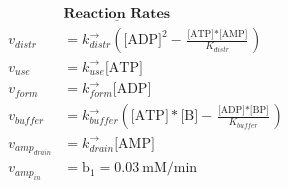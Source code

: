 \documentclass[10pt]{article}
\begin{document}
\begin{align*}&\underline{\textbf{Reaction Rates}}\\
v_{distr} &= k^{\rightarrow}_{distr}(\text{[ADP]}^2 - \frac{\text{[ATP]} * \text{[AMP]}}{K_{distr}})\\
v_{use} &= k^{\rightarrow}_{use}\text{[ATP]} \\
v_{form} &= k^{\rightarrow}_{form}\text{[ADP]} \\
v_{buffer} &= k^{\rightarrow}_{buffer}(\text{[ATP]} * \text{[B]} - \frac{\text{[ADP]} * \text{[BP]}}{K_{buffer}})\\
v_{amp_{drain}} &= k^{\rightarrow}_{drain}\text{[AMP]}\\
v_{amp_{in}} &= \text{b}_1 = 0.03\ \text{mM/min}\\

\end{align*}
\end{document}
